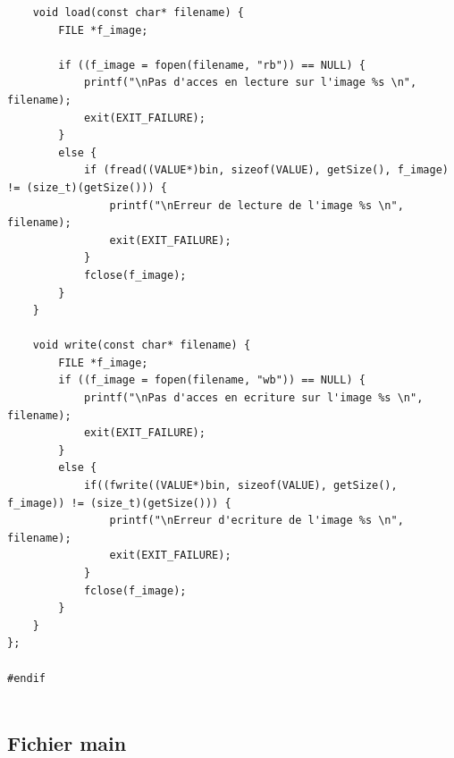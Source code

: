 \documentclass[a4paper,11pt]{article}
\begin{document}
\begin{lstlisting}
	void load(const char* filename) {
		FILE *f_image;

		if ((f_image = fopen(filename, "rb")) == NULL) {
			printf("\nPas d'acces en lecture sur l'image %s \n", filename);
			exit(EXIT_FAILURE);
		}
		else {
			if (fread((VALUE*)bin, sizeof(VALUE), getSize(), f_image) != (size_t)(getSize())) {
				printf("\nErreur de lecture de l'image %s \n", filename);
				exit(EXIT_FAILURE);
			}
			fclose(f_image);
		}
	}

	void write(const char* filename) {
		FILE *f_image;
		if ((f_image = fopen(filename, "wb")) == NULL) {
			printf("\nPas d'acces en ecriture sur l'image %s \n", filename);
			exit(EXIT_FAILURE);
		}
		else {
			if((fwrite((VALUE*)bin, sizeof(VALUE), getSize(), f_image)) != (size_t)(getSize())) {
				printf("\nErreur d'ecriture de l'image %s \n", filename);
				exit(EXIT_FAILURE);
			}
			fclose(f_image);
		}
	}
};

#endif


\end{lstlisting}

\subsection{Fichier main}
\end{document}
